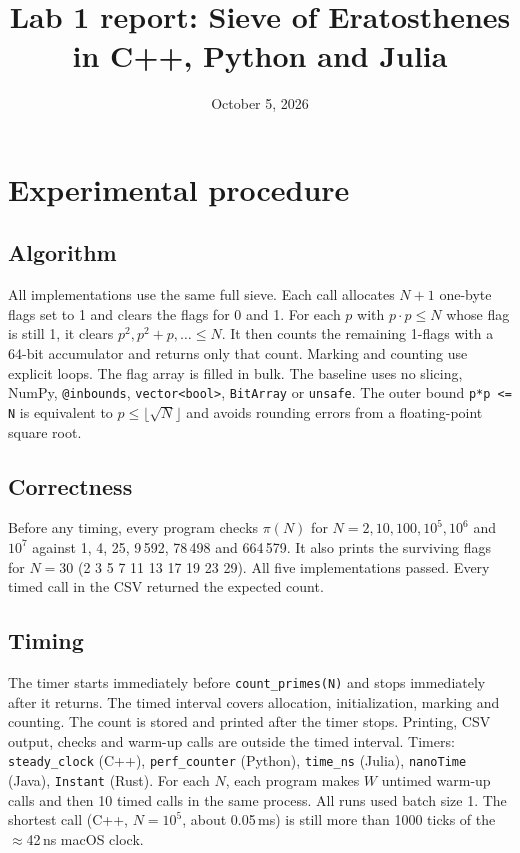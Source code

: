 \documentclass[11pt,a4paper]{article}
\title{Lab 1 report: Sieve of Eratosthenes in C++, Python and Julia}
\author{}
\date{October 5, 2026}
\newcommand{\code}[1]{\texttt{#1}}
\newcommand{\tenp}[1]{10^{#1}}
\begin{document}
\maketitle

\section{Experimental procedure}

\subsection*{Algorithm}
All implementations use the same full sieve. Each call allocates $N+1$ one-byte flags set to 1 and
clears the flags for 0 and 1. For each $p$ with $p \cdot p \le N$ whose flag is still 1, it clears
$p^2, p^2+p, \dots \le N$. It then counts the remaining 1-flags with a 64-bit accumulator and returns
only that count. Marking and counting use explicit loops. The flag array is filled in bulk. The
baseline uses no slicing, NumPy, \code{@inbounds}, \code{vector<bool>}, \code{BitArray} or
\code{unsafe}. The outer bound \code{p*p <= N} is equivalent to $p \le \lfloor\sqrt{N}\rfloor$ and
avoids rounding errors from a floating-point square root.

\subsection*{Correctness}
Before any timing, every program checks $\pi(N)$ for $N = 2, 10, 100, \tenp{5}, \tenp{6}$ and
$\tenp{7}$ against 1, 4, 25, 9\,592, 78\,498 and 664\,579. It also prints the surviving flags for
$N = 30$ (2 3 5 7 11 13 17 19 23 29). All five implementations passed. Every timed call in the CSV
returned the expected count.

\subsection*{Timing}
The timer starts immediately before \code{count\_primes(N)} and stops immediately after it returns.
The timed interval covers allocation, initialization, marking and counting. The count is stored and
printed after the timer stops. Printing, CSV output, checks and warm-up calls are outside the timed
interval. Timers: \code{steady\_clock} (C++), \code{perf\_counter} (Python), \code{time\_ns}
(Julia), \code{nanoTime} (Java), \code{Instant} (Rust). For each $N$, each program makes $W$ untimed
warm-up calls and then 10 timed calls in the same process. All runs used batch size 1. The shortest
call (C++, $N=\tenp{5}$, about 0.05\,ms) is still more than 1000 ticks of the $\approx$42\,ns macOS
clock.
\end{document}

